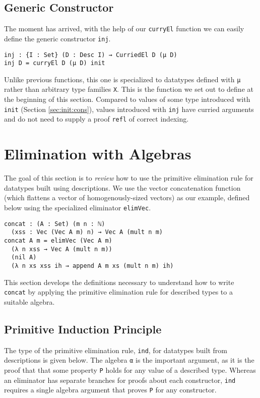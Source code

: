 \documentclass[nonatbib]{sigplanconf}
\newcommand{\refsec}[1]{Section \ref{sec:#1}}
\begin{document}
\subsection{Generic Constructor}

The moment has arrived, with the help of our {\tt curryEl} function we
can easily define the generic constructor {\tt inj}.

\begin{verbatim}
inj : {I : Set} (D : Desc I) → CurriedEl D (μ D)
inj D = curryEl D (μ D) init
\end{verbatim}

Unlike previous functions, this one is specialized to datatypes
defined with {\tt μ} rather than arbitrary type families {\tt X}. This
is the function we set out to define at the beginning of this section.
Compared to values of some type introduced with {\tt init} (\refsec{init:cons}),
values introduced with {\tt inj} have curried arguments and do not
need to supply a proof {\tt refl} of correct indexing.

\section{Elimination with Algebras}
\label{sec:ind}

The goal of this section is to {\it review} how to use the primitive
elimination rule for datatypes built using descriptions. We use
the vector concatenation function (which flattens a vector of
homogenously-sized vectors) as our example, defined below using the
specialized eliminator {\tt elimVec}.

\begin{verbatim}
concat : (A : Set) (m n : ℕ)
  (xss : Vec (Vec A m) n) → Vec A (mult n m)
concat A m = elimVec (Vec A m)
  (λ n xss → Vec A (mult n m))
  (nil A)
  (λ n xs xss ih → append A m xs (mult n m) ih)
\end{verbatim}

This section develops the definitions necessary to understand how to
write {\tt concat} by applying the primitive elimination rule for
described types to a suitable algebra.

\subsection{Primitive Induction Principle}

The type of the primitive elimination rule, {\tt ind}, for datatypes built from
descriptions is given below.
The algebra {\tt α} is the important argument, as it is the proof that
that some property {\tt P} holds for any value of a
described type.
Whereas an eliminator
has separate branches for proofs about each constructor, {\tt ind}
requires a single algebra argument that proves {\tt P} for any
constructor.
\end{document}
